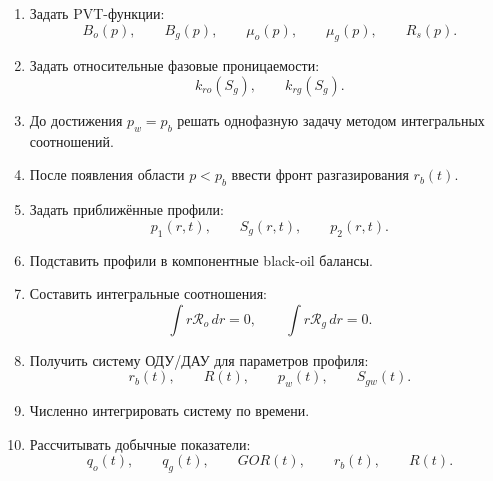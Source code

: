 \documentclass[12pt,a4paper]{article}
\begin{document}
\begin{enumerate}[label=\arabic*.]
    \item Задать PVT-функции:
    \begin{equation}
        B_o(p), \qquad B_g(p), \qquad \mu_o(p), \qquad \mu_g(p), \qquad R_s(p).
    \end{equation}

    \item Задать относительные фазовые проницаемости:
    \begin{equation}
        k_{ro}(S_g), \qquad k_{rg}(S_g).
    \end{equation}

    \item До достижения $p_w=p_b$ решать однофазную задачу методом интегральных соотношений.

    \item После появления области $p<p_b$ ввести фронт разгазирования $r_b(t)$.

    \item Задать приближённые профили:
    \begin{equation}
        p_1(r,t), \qquad S_g(r,t), \qquad p_2(r,t).
    \end{equation}

    \item Подставить профили в компонентные black-oil балансы.

    \item Составить интегральные соотношения:
    \begin{equation}
        \int r\mathcal{R}_o\,dr=0,
        \qquad
        \int r\mathcal{R}_g\,dr=0.
    \end{equation}

    \item Получить систему ОДУ/ДАУ для параметров профиля:
    \begin{equation}
        r_b(t), \qquad R(t), \qquad p_w(t), \qquad S_{gw}(t).
    \end{equation}

    \item Численно интегрировать систему по времени.

    \item Рассчитывать добычные показатели:
    \begin{equation}
        q_o(t), \qquad q_g(t), \qquad GOR(t), \qquad r_b(t), \qquad R(t).
    \end{equation}
\end{enumerate}
\end{document}
